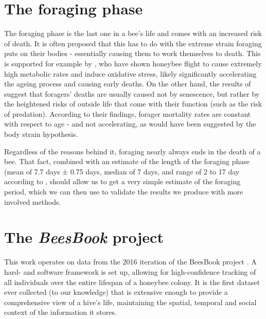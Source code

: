 \section{The foraging phase}
The foraging phase is the last one in a bee’s life and comes with an increased risk of death. 
It is often proposed that this has to do with the extreme strain foraging puts on their bodies - 
essentially causing them to work themselves to death. This is supported for example by 
\citep{williams_age_2008}, %
who have shown honeybee flight to cause extremely high metabolic rates and induce oxidative stress, 
likely significantly accelerating the ageing process and causing early deaths. On the other hand,
the results of \citep{visscher_survivorship_1997} suggest that foragers’ deaths are usually caused 
not by senescence, but rather by the heightened risks of outside life that come with their function 
(such as the risk of predation). According to their findings, forager mortality rates are constant 
with respect to age - and not accelerating, as would have been suggested by the body strain hypothesis. 

Regardless of the reasons behind it, foraging nearly always ends in the death of a bee. That fact, 
combined with an estimate of the length of the foraging phase  (mean of 7.7 days ± 0.75 days, 
median of 7 days, and range of 2 to 17 day according to \citep{visscher_survivorship_1997}, 
should allow us to get a very simple estimate of the foraging period, which we can then use 
to validate the results we produce with more involved methods.



\section{The \textit{BeesBook} project}
This work operates on data from the 2016 iteration of the BeesBook project \citep{wario_automatic_2015}. 
A hard- and software framework is set up, allowing for high-confidence tracking of all individuals over 
the entire lifespan of a honeybee colony. It is the first dataset ever collected (to our knowledge) 
that is extensive enough to provide a comprehensive view of a hive’s life, maintaining the spatial, 
temporal and social context of the information it stores. 

